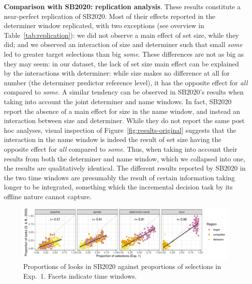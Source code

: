 \documentclass[10pt,letterpaper]{article}
\newcommand{\tableref}[1]{Table~\ref{#1}}
\newcommand{\figref}[1]{Figure~\ref{#1}}
\newcommand{\expref}[1]{Exp.~#1}
\newcommand{\jd}[1]{\textcolor{Red}{\textbf{[jd: #1]}}}
\begin{document}
\textbf{Comparison with SB2020: replication analysis}. These results constitute a near-perfect replication of  SB2020. Most of their effects reported in the determiner window replicated, with two exceptions (see overview in \tableref{tab:replication}): we did not observe a main effect of set size, while they did; and we observed an interaction of size and determiner such that small \emph{some} led to greater target selections than big \emph{some}. These differences are not as big as they may seem: in our dataset, the lack of set size main effect can be explained by the interactions with determiner: while size makes no difference at all for number (the determiner predictor reference level), it has the opposite effect for \emph{all} compared to \emph{some}. A similar tendency can be observed in SB2020's results when taking into account the joint determiner and name windows. In fact,  SB2020 report the absence of a main effect for size in the name window, and instead an interaction between size and determiner. While they do not report the same post hoc analyses, visual inspection of \figref{fig:results-original} suggests that the interaction in the name window is indeed the result of set size having the opposite effect for \emph{all} compared to \emph{some}. Thus, when taking into account their results from both the determiner and name window, which we collapsed into one, the results are qualitatively identical. The different results reported by  SB2020 in the two time windows are presumably the result of certain information taking longer to be integrated, something which the incremental decision task by its offline nature cannot capture. %

\begin{figure}
\centering
\includegraphics[width=.9\textwidth]{../../analysis/SunBreheny/1_incremental/main/graphs/corr-window}
\caption{Proportions of looks in SB2020 against proportions of selections in \expref{1}. Facets indicate time windows.} 
\label{fig:corr-window}
\end{figure}

\end{document}
